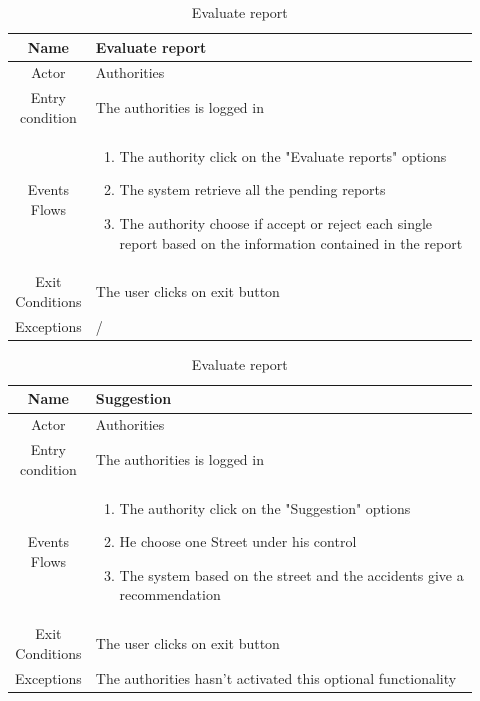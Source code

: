 \documentclass[12pt,a4paper]{report}
\begin{document}
			\begin{table}[H]
				\centering
				\begin{tabular}{|c|p{0.92\linewidth}|}
					\hline
					Name & {Evaluate report} \\
					\hline
					Actor & {Authorities} \\
					\hline
					Entry condition & {The authorities is logged in} \\
					\hline
					Events Flows &{ 
							\vskip 4pt
							\begin{enumerate}
								\item The authority click on the "Evaluate reports" options
								\item The system retrieve all the pending reports
								\item The authority choose if accept or reject each single report based on the information
									contained in the report
							\end{enumerate}
							\vskip 4pt}\\
					\hline
					Exit Conditions & {The user clicks on exit button} \\
					\hline
					Exceptions & {/} \\
					\hline
				\end{tabular}
				\caption{Evaluate report}
				\label{tab: }
			\end{table}
			
			\begin{table}[H]
				\centering
				\begin{tabular}{|c|p{0.92\linewidth}|}
					\hline
					Name & {Suggestion} \\
					\hline
					Actor & {Authorities} \\
					\hline
					Entry condition & {The authorities is logged in} \\
					\hline
					Events Flows &{ 
							\vskip 4pt
							\begin{enumerate}
								\item The authority click on the "Suggestion" options
								\item He choose one Street under his control
								\item The system based on the street and the accidents give a recommendation
							\end{enumerate}
							\vskip 4pt}\\
					\hline
					Exit Conditions & {The user clicks on exit button} \\
					\hline
					Exceptions & {The authorities hasn't activated this optional functionality} \\
					\hline
				\end{tabular}
				\caption{Evaluate report}
				\label{tab: }
			\end{table}
			
\end{document}
